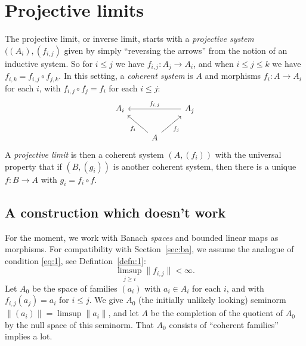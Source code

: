 \documentclass[a4paper,11pt]{article}
\theoremstyle{definition}
\begin{document}
\section{Projective limits}\label{sec:proj}

The projective limit, or inverse limit, starts with a \emph{projective system} $((A_i),(f_{i,j})$ given by simply ``reversing the arrows'' from the notion of an inductive system.  So for $i\leq j$ we have $f_{i,j} \colon A_j \to A_i$, and when $i\leq j\leq k$ we have $f_{i,k} = f_{i,j}\circ f_{j,k}$.  In this setting, a \emph{coherent system} is $A$ and morphisms $f_i\colon A\to A_i$ for each $i$, with $f_{i,j} \circ f_j = f_i$ for each $i\leq j$:
\[ \begin{tikzcd}
A_i && A_j \arrow[ll, "f_{i,j}"'] \\
& A \arrow[lu, "f_i"] \arrow[ru, "f_j"']
\end{tikzcd} \]
A \emph{projective limit} is then a coherent system $(A,(f_i))$ with the universal property that if $(B,(g_i))$ is another coherent system, then there is a unique $f \colon B \to A$ with $g_i = f_i \circ f$.


\subsection{A construction which doesn't work}

For the moment, we work with Banach \emph{spaces} and bounded linear maps as morphisms.  For compatibility with Section~\ref{sec:ba}, we assume the analogue of condition \eqref{eq:1}, see Defintion~\ref{defn:1}:
\[ \limsup_{j\geq i} \| f_{i,j} \| < \infty. \]
Let $A_0$ be the space of families $(a_i)$ with $a_i\in A_i$ for each $i$, and with $f_{i,j}(a_j) = a_i$ for $i\leq j$.  We give $A_0$ (the initially unlikely looking) seminorm $\|(a_i)\| = \limsup \|a_i\|$, and let $A$ be the completion of the quotient of $A_0$ by the null space of this seminorm.  That $A_0$ consists of ``coherent families'' implies a lot.
\end{document}
